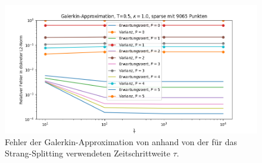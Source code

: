 \begin{figure}[!htb]
\centering
\includegraphics[width=\textwidth]{Figures/galerkin_trial8_sparse.png}
\caption{Fehler der Galerkin-Approximation von  anhand von der für das Strang-Splitting verwendeten Zeitschrittweite $\tau$.}
\label{fig:galerkin_bydt_trial8}
\end{figure}

